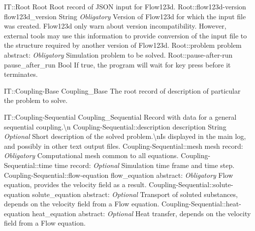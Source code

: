 \begin{RecordType}
	{IT::Root}
	{Root}
	{}%
	{}%
	{{{Root record of JSON input for Flow123d.}%
}}
		\RecKey
			{Root::flow123d-version}
			{flow123d{\_}version}
			{{String}}{}
			{ \it{Obligatory}}
			{{{Version of Flow123d for which the input file was created.
Flow123d only warn about version incompatibility.
However, external tools may use this information to provide conversion of the input file to the structure required by another version of Flow123d.}%
}}
		\RecKey
			{Root::problem}
			{problem}
			{{abstract: }}{}
			{ \it{Obligatory}}
			{{{Simulation problem to be solved.}%
}}
		\RecKey
			{Root::pause-after-run}
			{pause{\_}after{\_}run}
			{{Bool}}{}
			{ }
			{{{If true, the program will wait for key press before it terminates.}%
}}
\end{RecordType}
\begin{AbstractType}
	{IT::Coupling-Base}
	{Coupling{\_}Base}
	{}
	{{{The root record of description of particular the problem to solve.}%
}}
\end{AbstractType}
\begin{RecordType}
	{IT::Coupling-Sequential}
	{Coupling{\_}Sequential}
	{}%
	{}%
	{{{Record with data for a general sequential coupling.{\textbackslash}n}%
}}
		\RecKey
			{Coupling-Sequential::description}
			{description}
			{{String}}{}
			{ \it{Optional}}
			{{{Short description of the solved problem.{\textbackslash}nIs displayed in the main log, and possibly in other text output files.}%
}}
		\RecKey
			{Coupling-Sequential::mesh}
			{mesh}
			{{record: }}{}
			{ \it{Obligatory}}
			{{{Computational mesh common to all equations.}%
}}
		\RecKey
			{Coupling-Sequential::time}
			{time}
			{{record: }}{}
			{ \it{Optional}}
			{{{Simulation time frame and time step.}%
}}
		\RecKey
			{Coupling-Sequential::flow-equation}
			{flow{\_}equation}
			{{abstract: }}{}
			{ \it{Obligatory}}
			{{{Flow equation, provides the velocity field as a result.}%
}}
		\RecKey
			{Coupling-Sequential::solute-equation}
			{solute{\_}equation}
			{{abstract: }}{}
			{ \it{Optional}}
			{{{Transport of soluted substances, depends on the velocity field from a Flow equation.}%
}}
		\RecKey
			{Coupling-Sequential::heat-equation}
			{heat{\_}equation}
			{{abstract: }}{}
			{ \it{Optional}}
			{{{Heat transfer, depends on the velocity field from a Flow equation.}%
}}
\end{RecordType}
